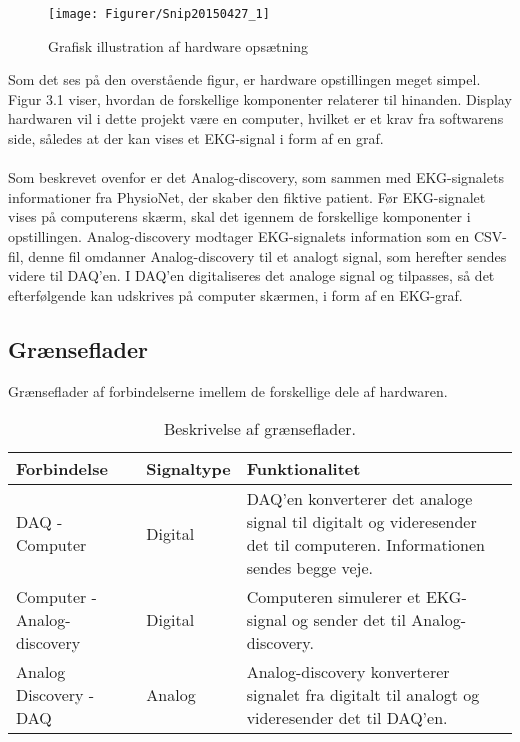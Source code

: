 \begin{figure}[H]
	\centering
	\texttt{[image: Figurer/Snip20150427\_1]}
	\caption{Grafisk illustration af hardware opsætning}
\end{figure}

Som det ses på den overstående figur, er hardware opstillingen meget simpel. Figur 3.1 viser, hvordan de forskellige komponenter relaterer til hinanden. Display hardwaren vil i dette projekt være en computer, hvilket er et krav fra softwarens side, således at der kan vises et EKG-signal i form af en graf.
\\
\\  
Som beskrevet ovenfor er det Analog-discovery, som sammen med EKG-signalets informationer fra PhysioNet, der skaber den fiktive patient. Før EKG-signalet vises på computerens skærm, skal det igennem de forskellige komponenter i opstillingen. Analog-discovery modtager EKG-signalets  information som en CSV-fil, denne fil omdanner Analog-discovery til et analogt signal, som herefter sendes videre til DAQ’en. I DAQ’en digitaliseres det analoge signal og tilpasses, så det efterfølgende kan udskrives på computer skærmen, i form af en EKG-graf. 

\subsection{Grænseflader}
Grænseflader af forbindelserne imellem de forskellige dele af hardwaren. 

\begin{table}[H] 
	\begin{tabularx}{\textwidth}{l l X}
    \toprule
     \textbf{Forbindelse}   & \textbf{Signaltype} & \textbf{Funktionalitet}    \\ \midrule
     DAQ - Computer         & Digital & DAQ'en konverterer det analoge signal til digitalt og videresender det til 							  computeren. Informationen sendes begge veje. \\ 
     					      \addlinespace[2mm]                                                                                                                                                                            
     Computer - Analog-discovery			& Digital & Computeren simulerer et EKG-signal og sender det til Analog-discovery.\\ 
     				    	  \addlinespace[2mm]   				                                                                                                                                                                           
     Analog Discovery - DAQ			   	& Analog & Analog-discovery	 konverterer signalet fra digitalt til analogt og videresender det til 							      DAQ'en.\\  				      
    \bottomrule                                                                                                                   
    \end{tabularx}
    \caption {Beskrivelse af grænseflader.}
    \label{tab:graenseflader}
\end{table}



